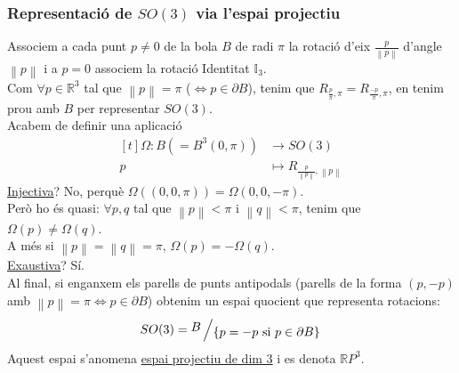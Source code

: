 \documentclass[../main.tex]{subfiles}
\begin{document}
	\subsubsection{Representació de $SO(3)$ via l'espai projectiu}
	Associem a cada punt $p \neq 0$ de la bola $B$ de radi $\pi$ la rotació d'eix $\frac{p}{\left\lVert p\right\rVert}$
	d'angle $\left\lVert p \right\rVert$ i a $p = 0$ associem la rotació Identitat $\mathbb{I}_3$.\\
	Com $\forall p \in \mathbb{R}^3$ tal que $\left\lVert p\right\rVert = \pi$ ($\Leftrightarrow p\in \partial B$),
	tenim que $R_{\frac{p}{\pi}, \pi} = R_{\frac{-p}{\pi}, \pi}$, en tenim prou amb $B$ per representar $SO(3)$.\\
	Acabem de definir una aplicació\\
	\begin{displaymath}
		\begin{aligned}[t]
			\Omega: B \left(= B^3(0, \pi)\right) &\longrightarrow SO(3)\\
			p &\longmapsto R_{\frac{p}{\left\lVert p\right\rVert}, \left\lVert p \right\rVert}
		\end{aligned}
	\end{displaymath}
	\underline{Injectiva}? No, perquè $\Omega((0,0,\pi)) = \Omega(0,0,-\pi)$.\\
	Però ho és quasi: $\forall p, q$ tal que $\left\lVert p \right\rVert < \pi$ i $\left\lVert q \right\rVert < \pi$, tenim que $\Omega{(p)} \neq \Omega{(q)}$.\\
	A més si $\left\lVert p \right\rVert = \left\lVert q \right\rVert = \pi$, $\Omega{(p)} = -\Omega{(q)}$.\\
	\underline{Exaustiva}? Sí.\\
	Al final, si enganxem els parells de punts antipodals (parells de la forma $(p,-p)$ amb $\left\lVert p \right\rVert = \pi \iff p \in \partial B$)
	obtenim un espai quocient que representa rotacions:\\
	\begin{displaymath}
		SO(3) = \bigslant{B}{\left\{p = -p \text{ si } p \in \partial B\right\}}
	\end{displaymath}
	Aquest espai s'anomena \underline{espai projectiu de dim 3} i es denota $\mathbb{R}P^3$.\\
\end{document}
